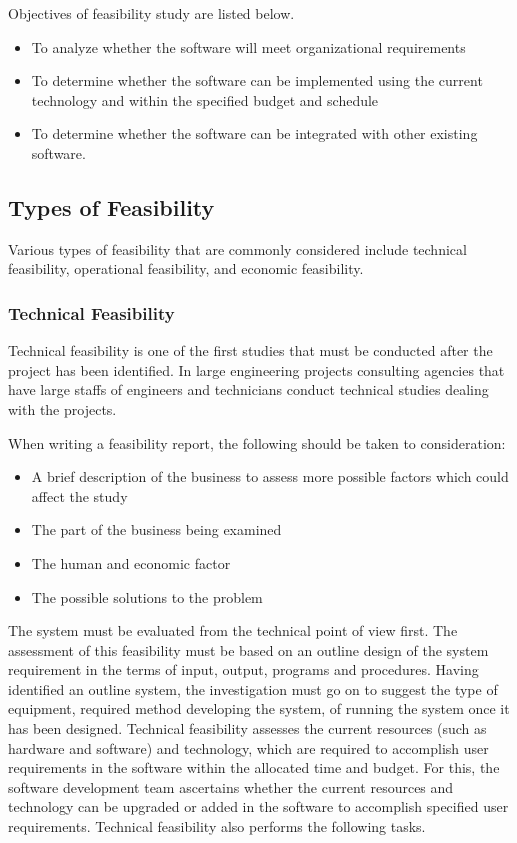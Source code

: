 Objectives of feasibility study are listed below.
\begin{itemize}
	\item To analyze whether the software will meet organizational requirements
	\item To determine whether the software can be implemented using the current technology and within the specified budget and schedule
	\item To determine whether the software can be integrated with other existing software.
\end{itemize}

\subsection{Types of Feasibility}
Various types of feasibility that are commonly considered include technical feasibility, operational feasibility, and economic feasibility.

\subsubsection{Technical Feasibility}
Technical feasibility is one of the first studies that must be conducted after the project has been identified. In large engineering projects consulting agencies that have large
staffs of engineers and technicians conduct technical studies dealing with the projects. 

When writing a feasibility report, the following should be taken to consideration:
\begin{itemize}
	\item A brief description of the business to assess more possible factors which could affect the study
	\item The part of the business being examined
	\item The human and economic factor
	\item The possible solutions to the problem
\end{itemize}

The system must be evaluated from the technical point of view first. The assessment of this feasibility must be based on an outline design of the system requirement in the terms of input, output, programs and procedures. Having identified an outline system, the investigation must go on to suggest the type of equipment, required method developing the system, of running the system once it has been designed. Technical feasibility assesses the current resources (such as hardware and software) and technology, which are required to accomplish user requirements in the software within the allocated time and budget. For this, the software development team ascertains whether the current resources and technology can be upgraded or added in the software to accomplish specified user requirements. Technical feasibility also performs the following tasks.

